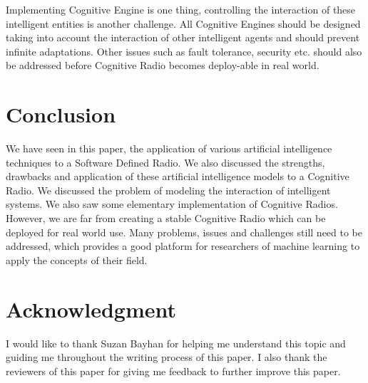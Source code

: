 \documentclass[conference]{IEEEtran}
\begin{document}
	Implementing Cognitive Engine is one thing, controlling the interaction of these intelligent entities is another challenge. All Cognitive Engines should be designed taking into account the interaction of other intelligent agents and should prevent infinite adaptations. Other issues such as fault tolerance, security etc. should also be addressed before Cognitive Radio becomes deploy-able in real world. \\


\section{Conclusion}
	We have seen in this paper, the application of various artificial intelligence techniques to a Software Defined Radio. We also discussed the strengths, drawbacks and application of these artificial intelligence models to a Cognitive Radio. We discussed the problem of modeling the interaction of intelligent systems. We also saw some elementary implementation of Cognitive Radios. However, we are far from creating a stable Cognitive Radio which can be deployed for real world use. Many problems, issues and challenges still need to be addressed, which provides a good platform for researchers of machine learning to apply the concepts of their field. 






\section*{Acknowledgment}

I would like to thank Suzan Bayhan for helping me understand this topic and guiding me throughout the writing process of this paper. I also thank the reviewers of this paper for giving me feedback to further improve this paper.




%





\end{document}
